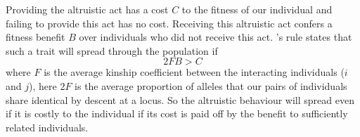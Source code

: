 Providing the altruistic act has a cost $C$ to the fitness of our individual and failing to provide this act has no cost. Receiving this altruistic act confers a fitness benefit $B$ over individuals who did not receive this act. \citeauthor{hamilton1964genetical}'s rule states that such a trait will spread through the population if 
\begin{equation}
 2F B > C 
\end{equation}
where $F$ is the average kinship coefficient between the interacting
individuals ($i$ and $j$), here $2F$ is the average proportion of
alleles that our pairs of individuals share identical by descent at a
locus. So the altruistic behaviour will spread even if it is costly to the individual if its cost is paid off by the benefit to sufficiently related individuals. 

